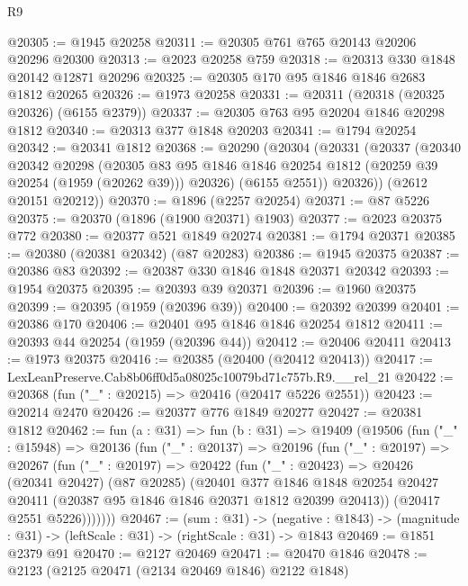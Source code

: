 \begin{lexlean}{R9}
\begin{coremodule}
@20305 := @1945 @20258
@20311 := @20305 @761 @765 @20143 @20206 @20296 @20300
@20313 := @2023 @20258 @759
@20318 := @20313 @330 @1848 @20142 @12871 @20296
@20325 := @20305 @170 @95 @1846 @1846 @2683 @1812 @20265
@20326 := @1973 @20258
@20331 := @20311 (@20318 (@20325 @20326) (@6155 @2379))
@20337 := @20305 @763 @95 @20204 @1846 @20298 @1812
@20340 := @20313 @377 @1848 @20203
@20341 := @1794 @20254
@20342 := @20341 @1812
@20368 := @20290
    (@20304
      (@20331
        (@20337
          (@20340
            @20342
            @20298
            (@20305
              @83
              @95
              @1846
              @1846
              @20254
              @1812
              (@20259 @39 @20254 (@1959 (@20262 @39)))
              @20326)
            (@6155 @2551))
          @20326))
      (@2612 @20151 @20212))
@20370 := @1896 (@2257 @20254)
@20371 := @87 @5226
@20375 := @20370 (@1896 (@1900 @20371) @1903)
@20377 := @2023 @20375 @772
@20380 := @20377 @521 @1849 @20274
@20381 := @1794 @20371
@20385 := @20380 (@20381 @20342) (@87 @20283)
@20386 := @1945 @20375
@20387 := @20386 @83
@20392 := @20387 @330 @1846 @1848 @20371 @20342
@20393 := @1954 @20375
@20395 := @20393 @39 @20371
@20396 := @1960 @20375
@20399 := @20395 (@1959 (@20396 @39))
@20400 := @20392 @20399
@20401 := @20386 @170
@20406 := @20401 @95 @1846 @1846 @20254 @1812
@20411 := @20393 @44 @20254 (@1959 (@20396 @44))
@20412 := @20406 @20411
@20413 := @1973 @20375
@20416 := @20385 (@20400 (@20412 @20413))
@20417 := LexLeanPreserve.Cab8b06ff0d5a08025c10079bd71c757b.R9.__rel_21
@20422 := @20368 (fun ("_" : @20215) => @20416 (@20417 @5226 @2551))
@20423 := @20214 @2470
@20426 := @20377 @776 @1849 @20277
@20427 := @20381 @1812
@20462 := fun (a : @31) =>
  fun (b : @31) =>
  @19409
    (@19506
      (fun ("_" : @15948) =>
      @20136
        (fun ("_" : @20137) =>
        @20196
          (fun ("_" : @20197) =>
          @20267
            (fun ("_" : @20197) =>
            @20422
              (fun ("_" : @20423) =>
              @20426
                (@20341 @20427)
                (@87 @20285)
                (@20401
                  @377
                  @1846
                  @1848
                  @20254
                  @20427
                  @20411
                  (@20387 @95 @1846 @1846 @20371 @1812 @20399 @20413))
                (@20417 @2551 @5226)))))))
@20467 := (sum : @31) ->
  (negative : @1843) -> (magnitude : @31) -> (leftScale : @31) -> (rightScale : @31) -> @1843
@20469 := @1851 @2379 @91
@20470 := @2127 @20469
@20471 := @20470 @1846
@20478 := @2123 (@2125 @20471 (@2134 @20469 @1846) @2122 @1848)

\end{coremodule}
\end{lexlean}
